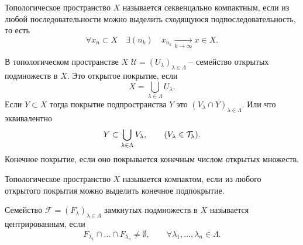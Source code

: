 \date{22 января 2025}
\begin{definition}
    Топологическое пространство $X$ называется секвенцально компактным, если из любой последовательности можно выделить сходящуюся подпоследовательность, то есть \[\forall x_n \subset X \quad\exists(n_k) \quad x_{n_k}\underset{k \to\infty}\to x \in X.\]
\end{definition}

\begin{definition}
    В топологическом пространстве $X$ $\mathcal U = (U_\lambda)_{\lambda \in \Lambda}$ -- семейство открытых подмножеств в $X$. Это открытое покрытие, если \[X = \bigcup_{\lambda \in \Lambda}U_{\lambda}.\] Если $Y\subset X$ тогда покрытие подпространства $Y$ это $(V_{\lambda}\cap Y)_{\lambda\in \Lambda}.$ Или что эквивалентно \[
    Y \subset \bigcup_{\lambda\in\Lambda}V_{\lambda}, \qquad(V_\lambda\in \mathcal T_{\lambda}).
    \]
    Конечное покрытие, если оно покрывается конечным числом открытых множеств.
\end{definition}

\begin{definition}
    [Компактность]
    Топологическое пространство $X$ называется компактом, если из любого открытого покрытия можно выделить конечное подпокрытие.
\end{definition}

\begin{definition}
    [Центрированность]
    Семейство $\mathcal F = (F_\lambda)_{\lambda\in\Lambda}$ замкнутых подмножеств в $X$ называется центрированным, если \[F_{\lambda_1}\cap\ldots\cap F_{\lambda_n} \neq \emptyset, \qquad \forall \lambda_1, \ldots, \lambda_n \in \Lambda.\]
\end{definition}

